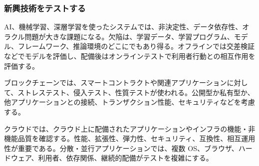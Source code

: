\subsubsection{新興技術をテストする}
AI、機械学習、深層学習を使ったシステムでは、非決定性、データ依存性、オラクル問題が大きな課題になる。欠陥は、学習データ、学習プログラム、モデル、フレームワーク、推論環境のどこにでもあり得る。オフラインでは交差検証などでモデルを評価し、配備後はオンラインテストで利用者行動との相互作用を評価する。

ブロックチェーンでは、スマートコントラクトや関連アプリケーションに対して、ストレステスト、侵入テスト、性質テストが使われる。公開型か私有型か、他アプリケーションとの接続、トランザクション性能、セキュリティなどを考慮する。

クラウドでは、クラウド上に配備されたアプリケーションやインフラの機能・非機能品質を確認する。性能、拡張性、弾力性、セキュリティ、互換性、相互運用性が重要である。分散・並行アプリケーションでは、複数 OS、ブラウザ、ハードウェア、利用者、依存関係、継続的配備がテストを複雑にする。
